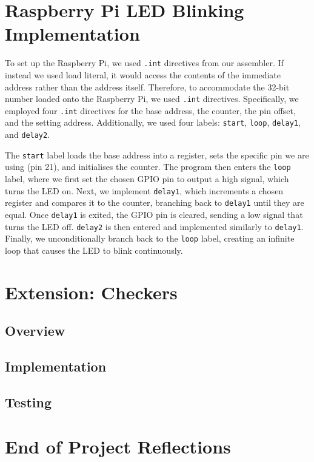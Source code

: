 \documentclass[11pt]{article}
\begin{document}
\section{Raspberry Pi LED Blinking Implementation}

To set up the Raspberry Pi, we used \texttt{.int} directives from our assembler. If instead we used load literal, it would access the contents of the immediate address rather than the address itself. Therefore, to accommodate the 32-bit number loaded onto the Raspberry Pi, we used \texttt{.int} directives. Specifically, we employed four \texttt{.int} directives for the base address, the counter, the pin offset, and the setting address. Additionally, we used four labels: \texttt{start}, \texttt{loop}, \texttt{delay1}, and \texttt{delay2}.

The \texttt{start} label loads the base address into a register, sets the specific pin we are using (pin 21), and initialises the counter. The program then enters the \texttt{loop} label, where we first set the chosen GPIO pin to output a high signal, which turns the LED on. Next, we implement \texttt{delay1}, which increments a chosen register and compares it to the counter, branching back to \texttt{delay1} until they are equal. Once \texttt{delay1} is exited, the GPIO pin is cleared, sending a low signal that turns the LED off. \texttt{delay2} is then entered and implemented similarly to \texttt{delay1}. Finally, we unconditionally branch back to the \texttt{loop} label, creating an infinite loop that causes the LED to blink continuously.

\section{Extension: Checkers}

\subsection{Overview}

\subsection{Implementation}

\subsection{Testing}

\section{End of Project Reflections}
\end{document}
